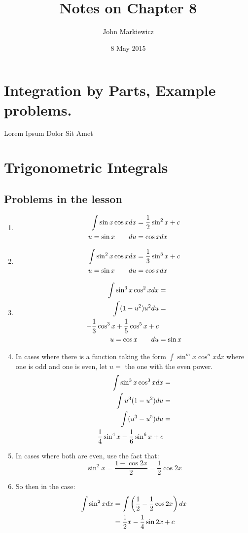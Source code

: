 \documentclass[11pt]{article}
\begin{document}
\title{Notes on Chapter 8}
\author{John Markiewicz}
\date{8 May 2015}
\maketitle
\section{Integration by Parts, Example problems.}
Lorem Ipsum
Dolor Sit Amet
\section{Trigonometric Integrals}
\subsection{Problems in the lesson}
\begin{enumerate}
	\item 
		\begin{align}
			\setcounter{equation}{0}
				\int \sin x \cos x dx  &= \frac{1}{2}\sin ^2 x +c \\
				u = \sin x \qquad du &= \cos x dx
		\end{align}
	\item 
		\begin{align}
			\setcounter{equation}{0}
			\int \sin ^2 x \cos x dx &= \frac{1}{3}\sin ^3 x + c\\
			u = \sin x \qquad du &= \cos x dx
		\end{align}
	\item 
		\begin{align}
			\setcounter{equation}{0}
			\int \sin ^3 x \cos ^2 x dx &=  \\
			\int (1-u^2) u^2 du &= \\
			-\frac{1}{3} \cos ^3 x + \frac{1}{5} \cos ^5 x + c \\
			u = \cos x \qquad du &= \sin x
		\end{align}
	\item In cases where there is a function taking the form $\int \sin ^m x 
		\cos ^n x dx$ where one is odd and one is even, let $u =$ the one with the 
		even power.
		\begin{align}
			\setcounter{equation}{0}
			\int \sin ^3 x \cos ^3 x dx &= \\
			\int u^3(1-u^2)du &= \\
			\int (u^3-u^5) du &= \\
			\frac{1}{4} \sin ^4 x - \frac{1}{6}\sin ^6 x + c
		\end{align}
	\item In cases where both are even, use the fact that: \[
			\sin ^2 x = \frac{1-\cos 2x}{2} = \frac{1}{2}\cos 2x
		\]
	\item So then in the case:
		\begin{align}
			\setcounter{equation}{0}
			\int \sin ^2 x dx &= \int \left(\frac{1}{2} - \frac{1}{2}\cos 2x\right) dx \\
												&= \frac{1}{2}x - \frac{1}{4}\sin 2x +c
		\end{align}
\end{enumerate}
\end{document}
